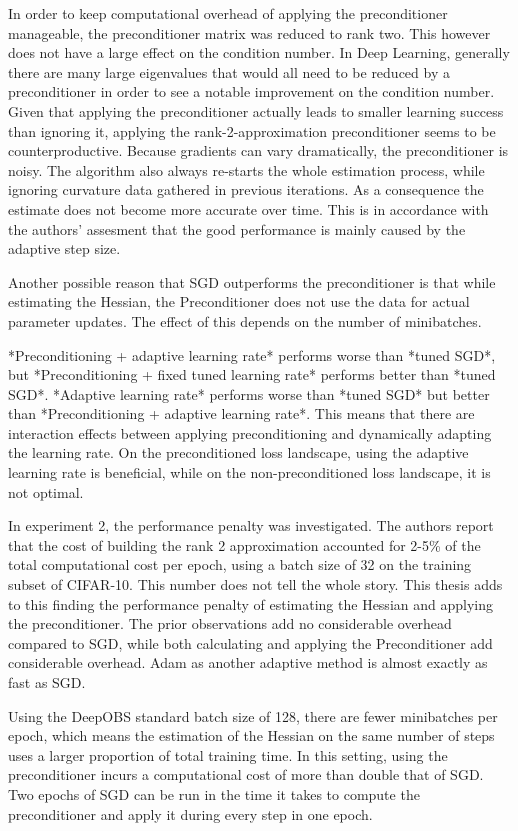 \documentclass[twoside,12pt,a4paper]{report}
\begin{document}
In order to keep computational overhead of applying the preconditioner manageable, the preconditioner matrix was reduced to rank two. This however does not have a large effect on the condition number. In Deep Learning, generally there are many large eigenvalues that would all need to be reduced by a preconditioner in order to see a notable improvement on the condition number. Given that applying the preconditioner actually leads to smaller learning success than ignoring it, applying the rank-2-approximation preconditioner seems to be counterproductive. Because gradients can vary dramatically, the preconditioner is noisy. The algorithm also always re-starts the whole estimation process, while ignoring curvature data gathered in previous iterations. As a consequence the estimate does not become more accurate over time. This is in accordance with the authors' assesment that the good performance is mainly caused by the adaptive step size.

Another possible reason that SGD outperforms the preconditioner is that while estimating the Hessian, the Preconditioner does not use the data for actual parameter updates. The effect of this depends on the number of minibatches.
\begin{markdown}
*Preconditioning + adaptive learning rate* performs worse than *tuned SGD*, but *Preconditioning + fixed tuned learning rate* performs better than *tuned SGD*. *Adaptive learning rate* performs worse than *tuned SGD* but better than *Preconditioning + adaptive learning rate*. This means that there are interaction effects between applying preconditioning and dynamically adapting the learning rate. On the preconditioned loss landscape, using the adaptive learning rate is beneficial, while on the non-preconditioned loss landscape, it is not optimal.
\end{markdown}

In experiment 2, the performance penalty was investigated. The authors report that the cost of building the rank 2 approximation accounted for 2-5\% of the total computational cost per epoch, using a batch size of 32 on the training subset of CIFAR-10. This number does not tell the whole story. This thesis adds to this finding the performance penalty of estimating the Hessian and applying the preconditioner. The prior observations add no considerable overhead compared to SGD, while both calculating and applying the Preconditioner add considerable overhead. Adam as another adaptive method is almost exactly as fast as SGD.

Using the DeepOBS standard batch size of 128, there are fewer minibatches per epoch, which means the estimation of the Hessian on the same number of steps uses a larger proportion of total training time. In this setting, using the preconditioner incurs a computational cost of more than double that of SGD. Two epochs of SGD can be run in the time it takes to compute the preconditioner and apply it during every step in one epoch.
\end{document}
